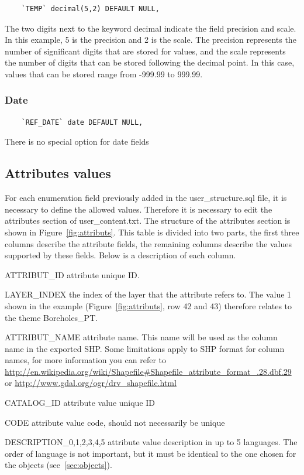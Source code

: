 \documentclass[a4paper, 12pt]{article}
\begin{document}
    \begin{lstlisting}
    `TEMP` decimal(5,2) DEFAULT NULL,
    \end{lstlisting}
    The two digits next to the keyword decimal indicate the field precision and scale. In this example, 5 is the precision and 2 is the scale. The precision represents the number of significant digits that are stored for values, and the scale represents the number of digits that can be stored following the decimal point. In this case, values that can be stored range from -999.99 to 999.99.
    \subsubsection {Date}

    \begin{lstlisting}
    `REF_DATE` date DEFAULT NULL,
    \end{lstlisting}
    There is no special option for date fields


\subsection{Attributes values}
\label{sec:attribute-values}
For each enumeration field  previously added in the user\_structure.sql file, it is necessary to define the allowed values. Therefore it is necessary to edit the attributes section of user\_content.txt. The structure of the attributes section is shown in Figure~\ref{fig:attributs}. This table is divided into two parts, the first three columns describe the attribute fields, the remaining columns describe the values supported by these fields. Below is a description of each column.

\begin{description*}
  \item [ATTRIBUT\_ID] attribute unique ID.
  \item [LAYER\_INDEX] the index of the layer that the attribute refers to. The value 1 shown in the example (Figure~\ref{fig:attributs}, row 42 and 43) therefore relates to the theme Boreholes\_PT.
  \item [ATTRIBUT\_NAME] attribute name. This name will be used as the column name in the exported SHP. Some limitations apply to SHP format for column names, for more information you can refer to \url{http://en.wikipedia.org/wiki/Shapefile#Shapefile\_attribute\_format\_.28.dbf.29} or \url{http://www.gdal.org/ogr/drv\_shapefile.html} 
  \item [CATALOG\_ID] attribute value unique ID
  \item [CODE] attribute value code, should not necessarily be unique
  \item [DESCRIPTION\_0,1,2,3,4,5] attribute value description in up to 5 languages. The order of language is not important, but it must be identical to the one chosen for the objects (see~\ref{sec:objects}).

\end{description*}
\end{document}
